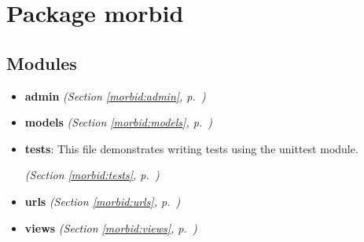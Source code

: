 %
%
%


\section{Package morbid}

    \label{morbid}


\subsection{Modules}

\begin{itemize}
\setlength{\parskip}{0ex}
\item \textbf{admin}
  \textit{(Section \ref{morbid:admin}, p.~\pageref{morbid:admin})}

\item \textbf{models}
  \textit{(Section \ref{morbid:models}, p.~\pageref{morbid:models})}

\item \textbf{tests}: This file demonstrates writing tests using the unittest module.



  \textit{(Section \ref{morbid:tests}, p.~\pageref{morbid:tests})}

\item \textbf{urls}
  \textit{(Section \ref{morbid:urls}, p.~\pageref{morbid:urls})}

\item \textbf{views}
  \textit{(Section \ref{morbid:views}, p.~\pageref{morbid:views})}

\end{itemize}

